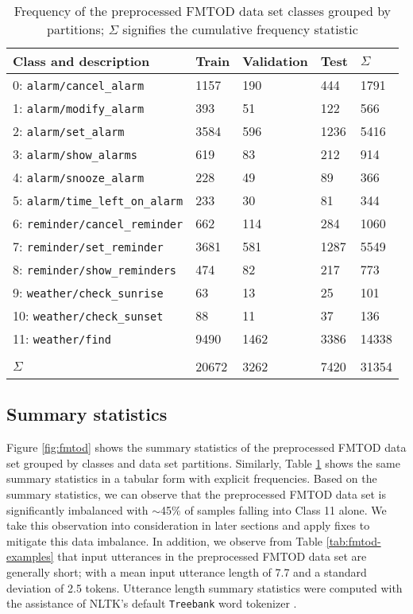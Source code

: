 \begin{table}[t!]
  \centering
  \begin{tabular}{lllll}
    \toprule
    Class and description & Train & Validation & Test & $\Sigma$ \\
    \midrule
    0: \texttt{alarm/cancel\_alarm} & 1157 & 190 & 444 & 1791 \\
    1: \texttt{alarm/modify\_alarm} & 393 & 51 & 122 & 566 \\
    2: \texttt{alarm/set\_alarm} & 3584 & 596 & 1236 & 5416 \\
    3: \texttt{alarm/show\_alarms} & 619 & 83 & 212 & 914 \\
    4: \texttt{alarm/snooze\_alarm} & 228 & 49 & 89 & 366 \\
    5: \texttt{alarm/time\_left\_on\_alarm} & 233 & 30 & 81 & 344 \\
    6: \texttt{reminder/cancel\_reminder} & 662 & 114 & 284 & 1060 \\
    7: \texttt{reminder/set\_reminder} & 3681 & 581 & 1287 & 5549 \\
    8: \texttt{reminder/show\_reminders} & 474 & 82 & 217 & 773 \\
    9: \texttt{weather/check\_sunrise} & 63 & 13 & 25 & 101 \\
    10: \texttt{weather/check\_sunset} & 88 & 11 & 37 & 136 \\
    11: \texttt{weather/find} & 9490 & 1462 & 3386 & 14338 \\[5pt]
    \hline \hline \\[-10pt]
    $\Sigma$ & 20672 & 3262 & 7420 & 31354 \\
    \bottomrule
  \end{tabular}
  \caption{Frequency of the preprocessed FMTOD data set classes grouped by partitions; $\Sigma$ signifies the cumulative frequency statistic}
  \label{tab:fmtod}
\end{table}

\subsection{Summary statistics}

Figure \ref{fig:fmtod} shows the summary statistics of the preprocessed FMTOD data set grouped by classes and data set partitions. Similarly, Table \ref{tab:fmtod} shows the same summary statistics in a tabular form with explicit frequencies. Based on the summary statistics, we can observe that the preprocessed FMTOD data set is significantly imbalanced with $\sim$45$\%$ of samples falling into Class 11 alone. We take this observation into consideration in later sections and apply fixes to mitigate this data imbalance. In addition, we observe from Table \ref{tab:fmtod-examples} that input utterances in the preprocessed FMTOD data set are generally short; with a mean input utterance length of 7.7 and a standard deviation of 2.5 tokens. Utterance length summary statistics were computed with the assistance of NLTK's default \texttt{Treebank} word tokenizer \citep{bird-loper-2004-nltk}.


